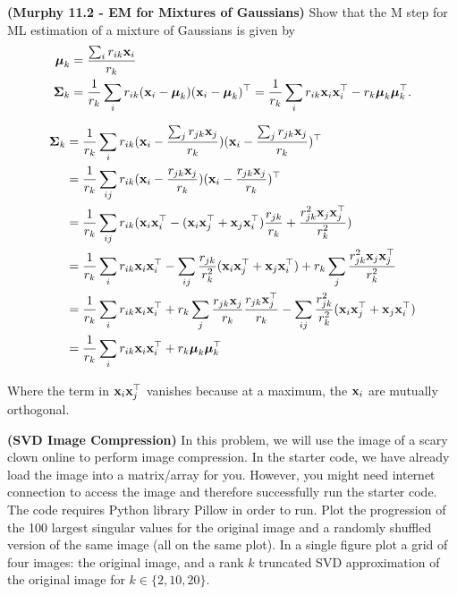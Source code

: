 \documentclass[12pt,letterpaper,fleqn]{hmcpset}
\begin{document}
\begin{problem}[1]
\textbf{(Murphy 11.2 - EM for Mixtures of Gaussians)} Show that the M step for ML
estimation of a mixture of Gaussians is given by
\begin{align*}
    \hbox{\boldmath$\mu$}_k &= \frac{\sum_i r_{ik}{\bf x}_i}{r_k}\\
    \hbox{\boldmath$\Sigma$}_k &= \frac{1}{r_k}\sum_i r_{ik}({\bf x}_i - \hbox{\boldmath$\mu$}_k)({\bf x}_i - \hbox{\boldmath$\mu$}_k)^\top = \frac{1}{r_k}\sum_i r_{ik}{\bf x}_i{\bf x}_i^\top - r_k\hbox{\boldmath$\mu$}_k\hbox{\boldmath$\mu$}_k^\top.
\end{align*}
\end{problem}
\begin{solution}

\begin{align*}
  \hbox{\boldmath$\Sigma$}_k &= \frac{1}{r_k}\sum_i r_{ik}({\bf x}_i - \frac{\sum_j r_{jk}{\bf x}_j}{r_k}) ({\bf x}_i - \frac{\sum_j r_{jk}{\bf x}_j}{r_k})^\top \\
  &= \frac{1}{r_k}\sum_{ij} r_{ik}({\bf x}_i - \frac{r_{jk}{\bf x}_j}{r_k}) ({\bf x}_i - \frac{r_{jk}{\bf x}_j}{r_k})^\top \\
  &= \frac{1}{r_k}\sum_{ij} r_{ik} ( {\bf x}_i{\bf x}_i^\top - ({\bf x}_i{\bf x}_j^\top + {\bf x}_j{\bf x}_i^\top) \frac{r_{jk}}{r_k} + \frac{r_{jk}^2{\bf x}_j{\bf x}_j^\top}{r_k^2} ) \\
  &= \frac{1}{r_k}\sum_{i} r_{ik} {\bf x}_i{\bf x}_i^\top - \sum_{ij} \frac {r_{jk}}{r_k^2} ({\bf x}_i{\bf x}_j^\top + {\bf x}_j{\bf x}_i^\top) + r_k \sum_j \frac{r_{jk}^2{\bf x}_j{\bf x}_j^\top}{r_k^2} \\
  &= \frac{1}{r_k}\sum_{i} r_{ik} {\bf x}_i{\bf x}_i^\top + r_k \sum_j \frac{r_{jk}{\bf x}_j}{r_k} \frac{r_{jk} {\bf x}_j^\top}{r_k}  - \sum_{ij} \frac {r_{jk}^2}{r_k^2} ({\bf x}_i{\bf x}_j^\top + {\bf x}_j{\bf x}_i^\top) \\
  &= \frac{1}{r_k}\sum_{i} r_{ik} {\bf x}_i{\bf x}_i^\top + r_k \hbox{\boldmath$\mu$}_k \hbox{\boldmath$\mu$}_k^\top
\end{align*}  

Where the term in ${\bf x}_i{\bf x}_j^\top$ vanishes because at a maximum, the ${\bf x}_i$ are mutually orthogonal.
\end{solution}

\vfill
\newpage



\begin{problem}[2]
\textbf{(SVD Image Compression)}
In this problem, we will use the image of a scary clown online to perform image compression.  In the starter code, we have already load the image into a matrix/array for you. However, you might need internet connection to access the image and therefore successfully run the starter code. The code requires Python library Pillow in order to run.
\newline
\newline 
Plot the progression of the 100 largest singular values for the original image
and a randomly shuffled version of the same image (all on the same plot). In a single figure plot
a grid of four images: the original image, and a rank $k$ truncated SVD approximation of the original
image for $k\in\{2,10,20\}$.

\end{problem}
\begin{solution}
\vfill
\end{solution}
\newpage
\end{document}
